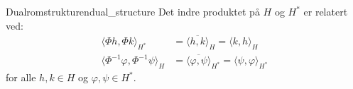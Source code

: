 \begin{corollary}{Dualromstrukturen}{dual_structure}
	Det indre produktet på $H$ og $H^*$ er relatert ved:
	\begin{align}
		\langle \Phi h, \Phi k \rangle_{H^*} &= \overline{\langle h, k \rangle}_H = \langle k, h \rangle_H \\
		\langle \Phi^{-1}\varphi, \Phi^{-1}\psi \rangle_H &= \overline{\langle \varphi, \psi \rangle}_{H^*} = \langle \psi, \varphi \rangle_{H^*}
	\end{align}
	for alle $h, k \in H$ og $\varphi, \psi \in H^*$.
\end{corollary}